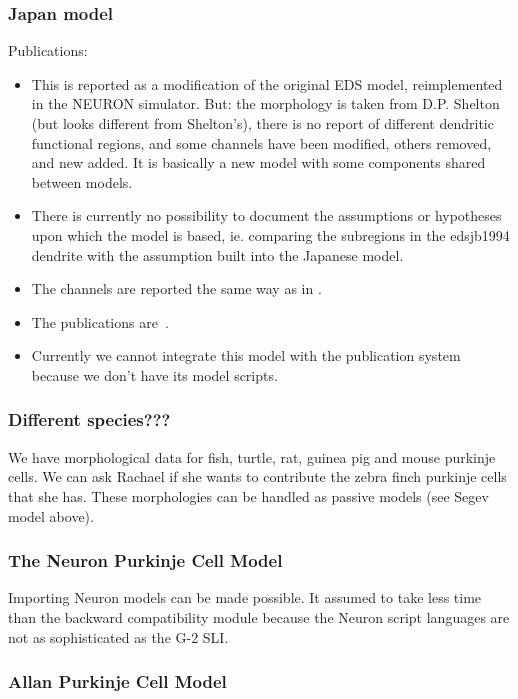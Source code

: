 \documentclass[12pt]{article}
\begin{document}
\subsubsection{Japan model}

Publications:~\cite{chono03:_purkin}\cite{miyasho01:_low_ca2_purkin}

\begin{itemize}
\item This is reported as a modification of the original EDS model,
  reimplemented in the NEURON simulator.  But: the morphology is taken
  from D.P. Shelton (but looks different from Shelton's), there is no
  report of different dendritic functional regions, and some channels
  have been modified, others removed, and new added.  It is basically
  a new model with some components shared between models.
\item There is currently no possibility to document the assumptions or
  hypotheses upon which the model is based, ie. comparing the
  subregions in the edsjb1994 dendrite with the assumption built into
  the Japanese model.
\item The channels are reported the same way as in
  \cite{deschutter94:_purkin_i}.
\item The publications are~\cite{miyasho01:_low_ca2_purkin,
    chono03:_purkin}.
\item Currently we cannot integrate this model with the publication
  system because we don't have its model scripts.
\end{itemize}

\subsubsection{Different species???}

We have morphological data for fish, turtle, rat, guinea pig and mouse
purkinje cells.  We can ask Rachael if she wants to contribute the
zebra finch purkinje cells that she has.  These morphologies can be
handled as passive models (see Segev model above).


\subsubsection{The Neuron Purkinje Cell Model}
Importing Neuron models can be made possible.  It assumed to take less
time than the backward compatibility module because the Neuron script
languages are not as sophisticated as the G-2 SLI.

\subsubsection{Allan Purkinje Cell Model}
\end{document}
